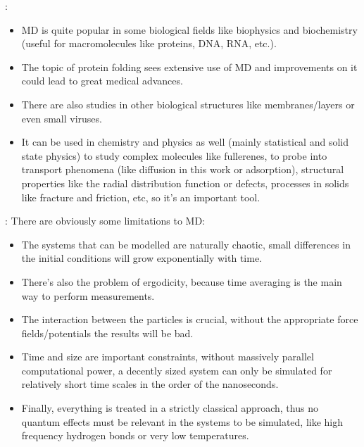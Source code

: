 \documentclass{beamer}
\begin{document}
			\begin{frame}{\secname : \subsecname}
				\begin{itemize}
					\item MD is quite popular in some biological fields like biophysics and biochemistry (useful for macromolecules like proteins, DNA, RNA, etc.).
					\item The topic of protein folding sees extensive use of MD and improvements on it could lead to great medical advances.
					\item There are also studies in other biological structures like membranes/layers or even small viruses\cite{virus}.
					\item It can be used in chemistry and physics as well (mainly statistical and solid state physics) to study complex molecules like fullerenes, to probe into transport phenomena (like diffusion in this work or adsorption), structural properties like the radial distribution function or defects, processes in solids like fracture and friction, etc, so it's an important tool.
				\end{itemize}
			\end{frame}
			
			\begin{frame}{\secname : \subsecname}
				There are obviously some limitations to MD:
				
				\begin{itemize}
					\item The systems that can be modelled are naturally chaotic, small differences in the initial conditions will grow exponentially with time. 
					\item There's also the problem of ergodicity, because time averaging is the main way to perform measurements.
					\item The interaction between the particles is crucial, without the appropriate force fields/potentials the results will be bad.
					\item Time and size are important constraints, without massively parallel computational power, a decently sized system can only be simulated for relatively short time scales in the order of the nanoseconds.
					\item Finally, everything is treated in a strictly classical approach, thus no quantum effects must be relevant in the systems to be simulated, like high frequency hydrogen bonds or very low temperatures.
				\end{itemize}
			\end{frame}
		 	
\end{document}

